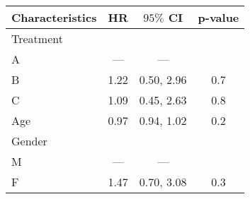 \begin{table}[!h]
\centering
\begin{tabular}{lccc}
\toprule
Characteristics & HR & $95\%$ CI & p-value\\
\midrule
Treatment &  &  & \\
A & — & — & \\
B & 1.22 & 0.50, 2.96 & 0.7\\
C & 1.09 & 0.45, 2.63 & 0.8\\
Age & 0.97 & 0.94, 1.02 & 0.2\\
\addlinespace
Gender &  &  & \\
M & — & — & \\
F & 1.47 & 0.70, 3.08 & 0.3\\
\bottomrule
\end{tabular}
\end{table}
